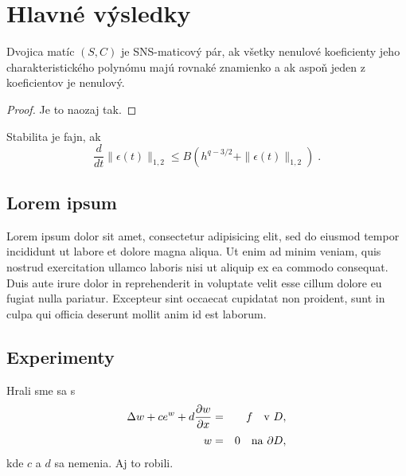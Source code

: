\documentclass{svk_long_sk}
\begin{document}
\section{Hlavné výsledky} 
 
\begin{theorem} 
\label{th:prop} 
Dvojica matíc $(S,C)$ je {\rm SNS}-maticový pár, ak všetky nenulové
koeficienty jeho charakteristického polynómu majú rovnaké znamienko a
ak aspoň jeden z koeficientov je nenulový.
\end{theorem} 
 
\begin{proof}
Je to naozaj tak. \qquad\end{proof} 
 
\begin{lemma}[{\rm Stabilita}]
\label{stability}
Stabilita je fajn, ak
\begin{equation}
\label{Gron}
\frac {d}{dt} \| \epsilon (t) \| _{1,2}  \leq B
   ( h^{q-3/2} + \| \epsilon (t) \|_{1,2})\;.
\end{equation}
\end{lemma}

\subsection{Lorem ipsum}

Lorem ipsum dolor sit amet, consectetur adipisicing elit, sed do eiusmod tempor incididunt ut labore et dolore magna aliqua. Ut enim ad minim veniam, quis nostrud exercitation ullamco laboris nisi ut aliquip ex ea commodo consequat. Duis aute irure dolor in reprehenderit in voluptate velit esse cillum dolore eu fugiat nulla pariatur. Excepteur sint occaecat cupidatat non proident, sunt in culpa qui officia deserunt mollit anim id est laborum.

\subsection{Experimenty}
Hrali sme sa s
\begin{eqnarray} 
{\displaystyle \Delta w + c e^w + d{ {\partial w}\over{\partial x} } } 
&=&{\displaystyle f \quad {\rm v}\ D, }\nonumber\\[-1.5ex]
\label{bratu} \\[-1.5ex]
{\displaystyle w }&=&{\displaystyle 0 \quad {\rm na}\ \partial D , } \nonumber
\end{eqnarray} 
kde $c$ a $d$ sa nemenia. Aj \cite{Brown-Saad1} to robili.
\end{document}
